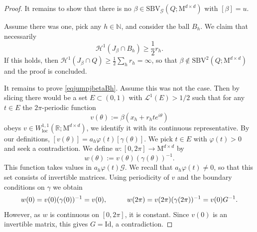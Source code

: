 \documentclass[a4paper,reqno]{amsart}
\newcommand\R{\mathbb{R}}
\newcommand\N{\mathbb{N}}
\newcommand{\SBV}{\mathrm{SBV}}
\newcommand{\SBVG}{\mathrm{SBV}_{\mathcal{G}}}
\newcommand\calH{\mathcal{H}}
\newcommand\calL{\mathcal{L}}
\newcommand\Id{{\mathrm{Id}}}
\newcommand\loc{{\mathrm{loc}}}
\theoremstyle{remark}
\newcommand{\G}{\mathcal{G}}
\newcommand{\Mno}{\mathrm{M}^{d\times d}}
\numberwithin{equation}{section}
\begin{document}
\begin{proof}
	It remains to show that there is no $\beta\in \SBVG(Q;\Mno)$ with $[\beta]=u$.
	
	Assume there was one, pick any $h\in \N$, and consider the ball $B_h$. 
	We claim that necessarily 
	\begin{equation}\label{eqjumpjbetaBh}
		\calH^1(J_\beta\cap B_h)\ge \frac 12 r_h.
	\end{equation}
	If this holds, then $\calH^1(J_\beta\cap Q)\ge \frac12 \sum_h r_h=\infty$, so that $\beta\not\in \SBV^2(Q;\Mno)$  and the proof is concluded.
	
	It remains to prove \eqref{eqjumpjbetaBh}.
	Assume this was not the case. 
	Then by slicing there would be a set $E\subset(0,1)$ 
	with $\calL^1(E)>1/2$ such that for any $t\in E$ the 
	$2\pi$-periodic
	function 
	\begin{equation*}
		v(\theta):= \beta(x_h+r_ht e^{i\theta})
	\end{equation*}
	obeys $v\in W^{1,1}_\mathrm{\loc}(\R;\Mno)$, we identify it with its continuous representative.
By our definitions, $[v(\theta)]=a_h\varphi(t)[\gamma(\theta)]$.
	We pick $t\in E$ with $\varphi(t)>0$ and seek a contradiction.
	We define $w:[0,2\pi]\to\Mno$ by
	\begin{equation*}
		w(\theta):= v(\theta)(\gamma(\theta))^{-1}.
	\end{equation*}
	This function takes values in $a_h\varphi(t)\G$. We recall that $a_h\varphi(t)\ne0$, so that this set consists of invertible matrices.
	Using periodicity of $v$ and the boundary conditions on $\gamma$ we obtain
	\begin{equation*}
		w(0)=v(0)(\gamma(0))^{-1}=v(0), \hskip1cm
		w(2\pi)=v(2\pi)(\gamma(2\pi))^{-1}=v(0)G^{-1}.
	\end{equation*}
	However, as $w$ is continuous on $[0,2\pi]$, it is constant.
	Since $v(0)$ is an invertible matrix, this gives $G=\Id$, a contradiction.
\end{proof}
\end{document}
